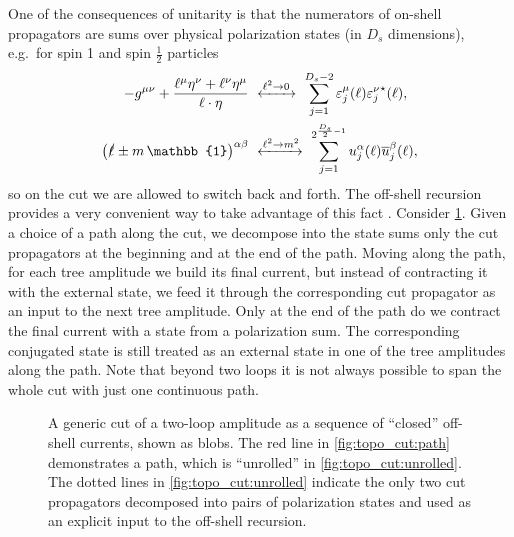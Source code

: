One of the consequences of unitarity is that the numerators of on-shell propagators are
sums over physical polarization states (in $D_s$ dimensions),
e.g.\ for spin 1 and spin $\frac{1}{2}$ particles
\begin{subequations}
  \begin{align}
    -g^{\mu\nu} + \frac{\ell^\mu \eta^\nu + \ell^\nu \eta^\mu}{\sp(\ell,\eta)}  &~\xleftrightarrow{\ell^2\to 0\;}~  \sum_{j=1}^{D_s-2} \varepsilon^\mu_j(\ell){\varepsilon^\nu_j}^{\star{}}(\ell) , \\
    \qty(\slashed{\ell}  \pm m\,\mathbb{1})^{\alpha\beta} &~\xleftrightarrow{\ell^2\to m^2}~ \sum_{j=1}^{2^{\frac{D_s}{2}-1}} u^\alpha_j(\ell){\overline{u}_j^\beta}(\ell),
  \end{align}
\end{subequations}
so on the cut we are allowed to switch back and forth.
The off-shell recursion provides a very convenient way to take advantage of this fact \cite{Badger:2012pg,Peraro:2016wsq}.
Consider \cref{fig:topo_cut}. Given a choice of a path along the cut,
we decompose into the state sums only the cut propagators at the beginning and at the end of the path.
Moving along the path, 
for each tree amplitude we build its final current,
but instead of contracting it with the external state, we feed it through
the corresponding cut propagator as an input to the next tree amplitude.
Only at the end of the path do we contract the final current with a state from a polarization sum.
The corresponding conjugated state is still treated as an external state in one of the tree amplitudes along the path.
Note that beyond two loops it is not always possible to span the whole cut with just one continuous path.

\begin{figure}[ht]
  \centering
  \hfill
  \caption{A generic cut of a two-loop amplitude as a sequence of ``closed'' off-shell currents, shown as blobs.
    The red line in \cref{fig:topo_cut:path} demonstrates a path, which is ``unrolled'' in \cref{fig:topo_cut:unrolled}.
    The dotted lines in \cref{fig:topo_cut:unrolled} indicate the only two cut propagators
    decomposed into pairs of polarization states and used as an explicit input to the off-shell recursion.
  }
  \label{fig:topo_cut}
\end{figure}


